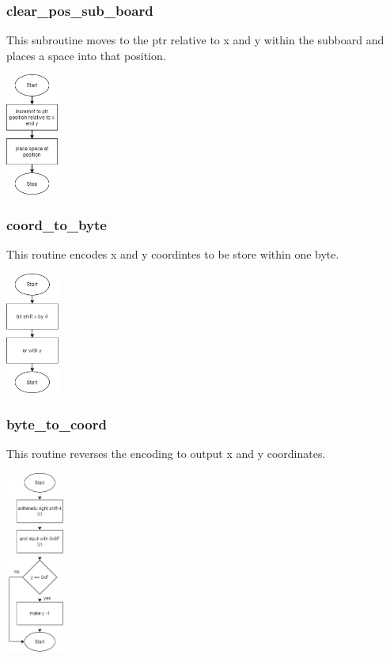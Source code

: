 \documentclass{article}
\begin{document}
    \subsubsection{clear\_pos\_sub\_board}
        This subroutine moves to the ptr relative to x and y
        within the subboard and places a space into that position.
        \begin{center}
            {\includegraphics[height=4cm]{clear_pos_sub_board.png}\centering} 
        \end{center}

    \subsubsection{coord\_to\_byte}
        This routine encodes x and y coordintes to be store within 
        one byte.
        \begin{center}
            {\includegraphics[height=4cm]{coord_to_byte.png}\centering} 
        \end{center}

    \subsubsection{byte\_to\_coord}
        This routine reverses the encoding to output x and y coordinates.
        \begin{center}
            {\includegraphics[height=6cm]{byte_to_coord.png}\centering} 
        \end{center}
        \newpage
\end{document}
